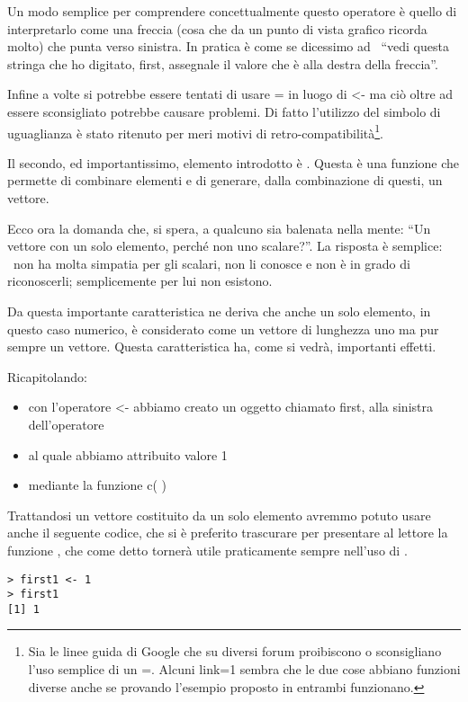 Un modo semplice per comprendere concettualmente questo operatore è quello di interpretarlo come una freccia (cosa che da un punto di vista grafico ricorda molto) che punta verso sinistra. In pratica è come se dicessimo ad \erre\ ``vedi questa stringa che ho digitato, first, assegnale il valore che è alla destra della freccia''.

Infine a volte si potrebbe essere tentati di usare = in luogo di <- ma ciò oltre ad essere sconsigliato potrebbe causare problemi. Di fatto l'utilizzo del simbolo di uguaglianza è stato ritenuto per meri motivi di retro-compatibilità\footnote{Sia le linee guida di Google che su diversi forum proibiscono o sconsigliano l'uso semplice di un =. Alcuni link=1 sembra che le due cose abbiano funzioni diverse anche se provando l'esempio proposto in \erre entrambi funzionano.}.

Il secondo, ed importantissimo, elemento introdotto è . Questa è una funzione che permette di combinare elementi e di generare, dalla combinazione di questi, un vettore.

Ecco ora la domanda che, si spera, a qualcuno sia balenata nella mente: ``Un vettore con un solo elemento, perché non uno scalare?''. La risposta è semplice: \erre\ non ha molta simpatia per gli scalari, non li conosce e non è in grado di riconoscerli; semplicemente per lui non esistono.

Da questa importante caratteristica ne deriva che anche un solo elemento, in questo caso numerico, è considerato come un vettore di lunghezza uno ma pur sempre un vettore. Questa caratteristica ha, come si vedrà, importanti effetti.

Ricapitolando:
\begin{itemize}
\item con l'operatore <- abbiamo creato un oggetto chiamato first, alla sinistra dell'operatore
\item al quale abbiamo attribuito valore 1
\item mediante la funzione c( )
\end{itemize}

Trattandosi un vettore costituito da un solo elemento avremmo potuto usare anche il seguente codice, che si è preferito trascurare per presentare al lettore la funzione , che come detto tornerà utile praticamente sempre nell'uso di \erre.
\begin{lstlisting}
> first1 <- 1
> first1
[1] 1
\end{lstlisting}

